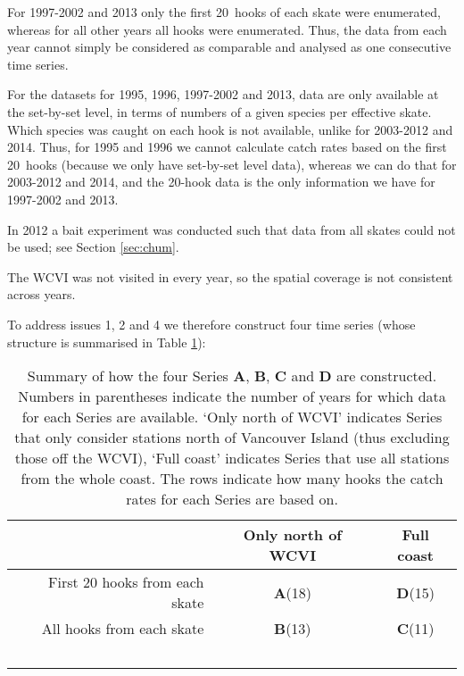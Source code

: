\begin{resdoclist}

\item For 1997-2002 and 2013 only the first 20~hooks of each skate were
enumerated, whereas for all other years all hooks were enumerated. Thus, the
data from each year cannot simply be considered as comparable and analysed as
one consecutive time series.

\item For the datasets for 1995, 1996, 1997-2002 and 2013, data are only
available at the set-by-set level, in terms of numbers of a given species per
effective skate. Which species was caught on each hook is not available, unlike
for 2003-2012 and 2014. Thus, for 1995 and 1996 we cannot calculate catch rates
based on the first 20~hooks (because we only have set-by-set level data),
whereas we can do that for 2003-2012 and 2014, and the 20-hook data is the only
information we have for 1997-2002 and 2013.

\item In 2012 a bait experiment was conducted such that data from all skates
could not be used; see Section \ref{sec:chum}.

\item The WCVI was not visited in every year, so the spatial coverage is not
consistent across years.

\end{resdoclist}


To address issues 1, 2 and 4 we therefore construct four time series (whose
structure is summarised in Table \ref{tab:seriesSumm}):

\begin{table}[t] \centering
\caption{Summary of how the four Series {\bf A}, {\bf B}, {\bf C} and {\bf D}
are constructed. Numbers in parentheses indicate the number of years for which
data for each Series are available. `Only north of WCVI' indicates Series that
only consider stations north of Vancouver Island (thus excluding those off the
WCVI), `Full coast' indicates Series that use all stations from the whole
coast. The rows indicate how many hooks the catch rates for each Series are
based on.}
\label{tab:seriesSumm}
\begin{tabular}{rcc}
\hline
 & Only north of WCVI & Full coast \\
\hline
First 20 hooks from each skate & {\bf A}(18) & {\bf D}(15)\\
All hooks from each skate & {\bf B}(13) & {\bf C}(11)\\
\hline
~\\    %
\end{tabular}
\end{table}

